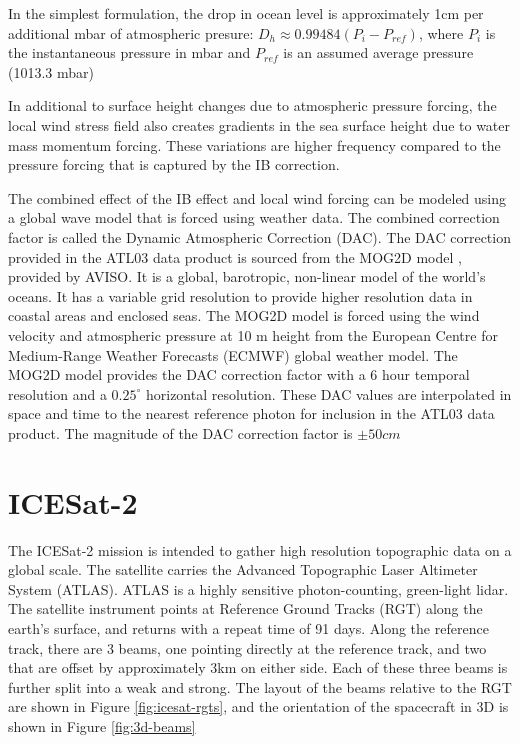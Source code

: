 In the simplest formulation, the drop in ocean level is approximately 1cm per additional mbar of atmospheric presure: $D_h \approx 0.99484(P_i-P_{ref})$, where $P_i$ is the instantaneous pressure in mbar and $P_{ref}$ is an assumed average pressure (1013.3 mbar) \parencite{Neumann2019e}

In additional to surface height changes due to atmospheric pressure forcing, the local wind stress field also creates gradients in the sea surface height due to water mass momentum forcing. These variations are higher frequency compared to the pressure forcing that is captured by the IB correction.

The combined effect of the IB effect and local wind forcing can be modeled using a global wave model that is forced using weather data. The combined correction factor is called the Dynamic Atmospheric Correction (DAC). The DAC correction provided in the ATL03 data product is sourced from the MOG2D model \parencite{LeProvost1994}, provided by AVISO. It is a global, barotropic, non-linear model of the world's oceans. It has a variable grid resolution to provide higher resolution data in coastal areas and enclosed seas. The MOG2D model is forced using the wind velocity and atmospheric pressure at 10 m height from the European Centre for Medium-Range Weather Forecasts (ECMWF) global weather model. The MOG2D model provides the DAC correction factor with a 6 hour temporal resolution and a $0.25^{\circ}$ horizontal resolution. These DAC values are interpolated in space and time to the nearest reference photon for inclusion in the ATL03 data product. The magnitude of the DAC correction factor is $\pm 50 cm$


\section{ICESat-2}

The ICESat-2 mission is intended to gather high resolution topographic data on a global scale. The satellite carries the Advanced Topographic Laser Altimeter System (ATLAS). ATLAS is a highly sensitive photon-counting, green-light lidar. The satellite instrument points at Reference Ground Tracks (RGT) along the earth's surface, and returns with a repeat time of 91 days. Along the reference track, there are 3 beams, one pointing directly at the reference track, and two that are offset by approximately 3km on either side. Each of these three beams is further split into a weak and strong. The layout of the beams relative to the RGT are shown in Figure \ref{fig:icesat-rgts}, and the orientation of the spacecraft in 3D is shown in Figure \ref{fig:3d-beams}

